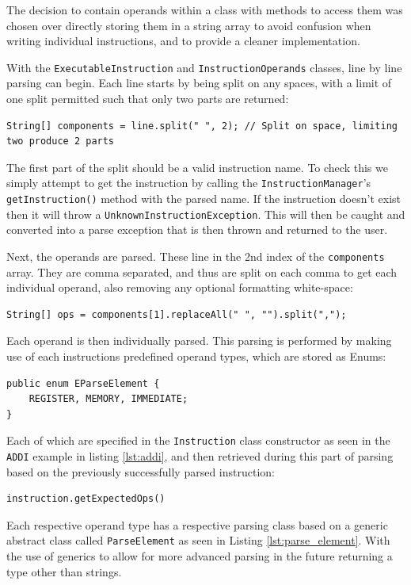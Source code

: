 The decision to contain operands within a class with methods to access them was chosen over directly storing them in a string array to avoid confusion when writing individual instructions, and to provide a cleaner implementation.

With the \texttt{ExecutableInstruction} and \texttt{InstructionOperands} classes, line by line parsing can begin. Each line starts by being split on any spaces, with a limit of one split permitted such that only two parts are returned:

\begin{lstlisting}
String[] components = line.split(" ", 2); // Split on space, limiting two produce 2 parts
\end{lstlisting}

The first part of the split should be a valid instruction name. To check this we simply attempt to get the instruction by calling the \texttt{InstructionManager}'s \verb|getInstruction()| method with the parsed name. If the instruction doesn't exist then it will throw a \texttt{UnknownInstructionException}. This will then be caught and converted into a parse exception that is then thrown and returned to the user.

Next, the operands are parsed. These line in the 2nd index of the \verb|components| array. They are comma separated, and thus are split on each comma to get each individual operand, also removing any optional formatting white-space:
\begin{lstlisting}
String[] ops = components[1].replaceAll(" ", "").split(",");
\end{lstlisting}

Each operand is then individually parsed. This parsing is performed by making use of each instructions predefined operand types, which are stored as Enums:

\begin{lstlisting}
public enum EParseElement {
    REGISTER, MEMORY, IMMEDIATE;
}
\end{lstlisting}

Each of which are specified in the \texttt{Instruction} class constructor as seen in the \texttt{ADDI} example in listing \ref{lst:addi}, and then retrieved during this part of parsing based on the previously successfully parsed instruction:
\begin{lstlisting}
instruction.getExpectedOps()
\end{lstlisting}

Each respective operand type has a respective parsing class based on a generic abstract class called \texttt{ParseElement} as seen in Listing \ref{lst:parse_element}. With the use of generics to allow for more advanced parsing in the future returning a type other than strings.

